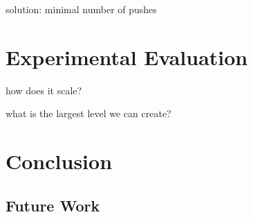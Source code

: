 \documentclass[runningheads]{llncs}
\begin{document}
solution: minimal number of pushes

\section{Experimental Evaluation}
how does it scale?

what is the largest level we can create?

\section{Conclusion}
\subsection{Future Work}

%
%
%


%
\end{document}
